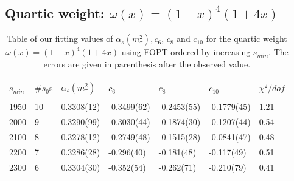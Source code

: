 \documentclass[../../index.tex]{subfiles}
\begin{document}
\subsection{Quartic weight: $\omega(x) = (1-x)^4(1+4x)$}
\begin{table}[H]
  \centering
  \begin{tabular}{lllllll}
    \toprule \\
    $s_{min}$ & \#$s_0$s & $\alpha_s(m_\tau^2)$ & $c_6$ & $c_8$ & $c_{10}$ & $\chi^2/dof$  \\
    \hline \\
    1950 & 10 & 0.3308(12) & -0.3499(62) & -0.2453(55) & -0.1779(45) & 1.21 \\
    2000 & 9 & 0.3290(99) & -0.3030(44) & -0.1874(30) & -0.1207(44) & 0.54 \\
    2100 & 8 & 0.3278(12) & -0.2749(48) & -0.1515(28) & -0.0841(47) & 0.48 \\
    2200 & 7 & 0.3286(28) & -0.296(40) & -0.181(48) & -0.117(49) & 0.51 \\
    2300 & 6 & 0.3304(30) & -0.352(54) & -0.262(71) & -0.210(79) & 0.41 \\
    \bottomrule
  \end{tabular}
  \caption{Table of our fitting values of $\alpha_s(m_\tau^2), c_6$, $c_8$ and
    $c_{10}$ for the quartic weight $\omega(x)=(1-x)^4(1+4x)$ using FOPT ordered
    by increasing $s_{min}$. The errors are given in parenthesis after the observed value.}
  \label{table:fitWCubicAlD6D8D10}
\end{table}
\end{document}
